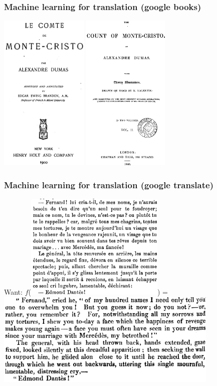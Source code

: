 \documentclass{beamer}
\begin{document}
\begin{frame}
  \frametitle{Machine learning for translation (google books)}

  \includegraphics[height=3in]{translation/monte-cristo-french-title}
  \includegraphics[height=3in]{translation/monte-cristo-english-title}

\end{frame}

\begin{frame}
  \frametitle{Machine learning for translation (google translate)}

  
  Want: $f$(\includegraphics[width=0.5\textwidth]{translation/monte-cristo-french}) =
\includegraphics[width=0.8\textwidth]{translation/monte-cristo-english}

\end{frame}
\end{document}
